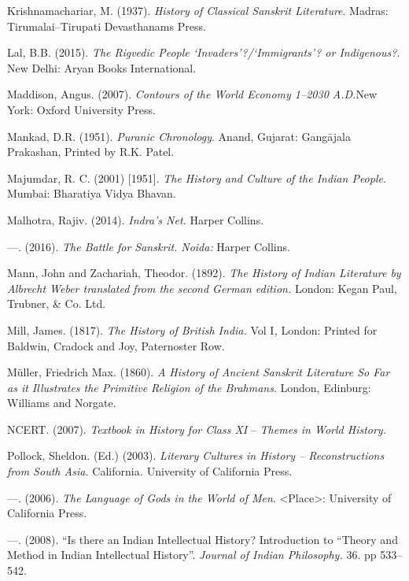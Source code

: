\begin{thebibliography}{99}
  Krishnamachariar, M. (1937). \textit{History of Classical Sanskrit Literature}. Madras: Tirumalai–Tirupati Devasthanams Press.

  Lal, B.B. (2015). \textit{The Rigvedic People ‘Invaders’?/‘Immigrants’? or Indigenous?}. New Delhi: Aryan Books International.

  Maddison, Angus. (2007). \textit{Contours of the World Economy 1–2030 A.D.}New York: Oxford University Press.

  Mankad, D.R. (1951). \textit{Puranic Chronology}. Anand, Gujarat: Gangājala Prakashan, Printed by R.K. Patel.

  Majumdar, R. C. (2001) [1951]. \textit{The History and Culture of the Indian People}. Mumbai: Bharatiya Vidya Bhavan.

  Malhotra, Rajiv. (2014). \textit{Indra’s Net.} Harper Collins.

  —. (2016). \textit{The Battle for Sanskrit.} \textit{Noida:} Harper Collins.

  Mann, John and Zachariah, Theodor. (1892). \textit{The History of Indian Literature by Albrecht Weber translated from the second German edition.} London: Kegan Paul, Trubner, \& Co. Ltd.

  Mill, James. (1817). \textit{The History of British India.} Vol I\textit{,} London: Printed for Baldwin, Cradock and Joy, Paternoster Row.

  Müller, Friedrich Max. (1860). \textit{A History of Ancient Sanskrit Literature So Far as it Illustrates the Primitive Religion of the Brahmans}. London, Edinburg: Williams and Norgate.

  NCERT. (2007). \textit{Textbook in History for Class XI} – \textit{Themes in World History.}

  Pollock, Sheldon. (Ed.) (2003). \textit{Literary Cultures in History – Reconstructions from South Asia.} California\textit{.} University of California Press.

  —. (2006). \textit{The Language of Gods in the World of Men}. \textless Place\textgreater : University of California Press.

  —. (2008). “Is there an Indian Intellectual History? Introduction to “Theory and Method in Indian Intellectual History”. \textit{Journal of Indian Philosophy.} 36. pp 533–542.


\end{thebibliography}

